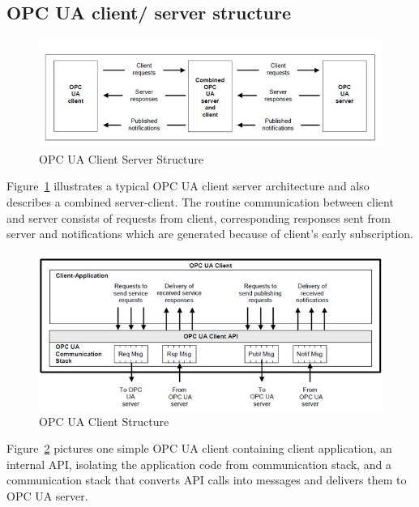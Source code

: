 \documentclass[]{llncs}
\begin{document}
\subsection{OPC UA client/ server structure}
\begin{figure}
	\centering
	\includegraphics[width=1.00\textwidth]{cs.jpg}
		\caption[ ]{OPC UA Client Server Structure\cite{O1}}
	\label{fig:cs}
\end{figure}
Figure~\ref{fig:cs} illustrates a typical OPC UA client server architecture and also describes a combined server-client. The routine communication between client and server consists of requests from client, corresponding responses sent from server and notifications which are generated because of client’s early subscription.

\begin{figure}
	\centering
	\includegraphics[width=1.1\textwidth]{client.jpg}
		\caption[ ]{OPC UA Client Structure\cite{O1}}
	\label{fig:client}
\end{figure}

Figure~\ref{fig:client} pictures one simple OPC UA client containing client application, an internal API, isolating the application code from communication stack, and a communication stack that converts API calls into messages and delivers them to OPC UA server.
\end{document}
